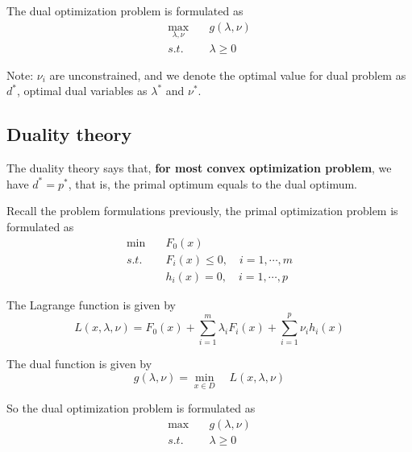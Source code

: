 \begin{definition} The dual optimization problem is formulated as
	\begin{align*}
		\max_{\lambda, \nu} \quad&g(\lambda, \nu) \\
		s.t. \quad&\lambda \geq 0
	\end{align*}
	
	Note: $\nu_i$ are unconstrained, and we denote the optimal value for dual problem as $d^*$, optimal dual variables as $\lambda^*$ and $\nu^*$.
\end{definition}


\subsection{Duality theory}
The duality theory says that, \textbf{for most convex optimization problem}, we have $d^* = p^*$, that is, the primal optimum equals to the dual optimum.

Recall the problem formulations previously, the primal optimization problem is formulated as 
\begin{align*}
	\min \quad&F_0(x) \\
	s.t. \quad&F_i(x)\leq 0, \quad i = 1,\cdots,m \\
	&h_i(x)= 0, \quad i = 1,\cdots,p
\end{align*}

The Lagrange function is given by 
\begin{equation*}
	L(x,\lambda,\nu) = F_0(x) + \sum^m_{i=1}\lambda_i F_i(x) + \sum^p_{i=1}\nu_i h_i(x)
\end{equation*}

The dual function is given by
\begin{equation*}
	g(\lambda, \nu) = \min_{x\in D}\quad L(x,\lambda,\nu) 
\end{equation*}

So the dual optimization problem is formulated as 
\begin{align*}
	\max \quad&g(\lambda, \nu) \\
	s.t. \quad&\lambda \geq 0
\end{align*}



